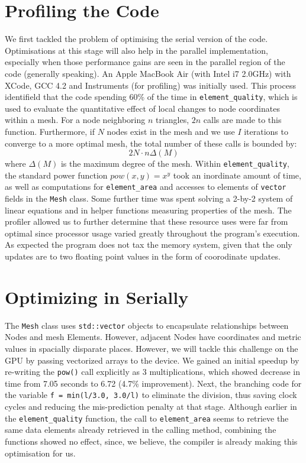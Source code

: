 \documentclass[a4paper,11pt, twocolumn]{article}
\begin{document}
\section{Profiling the Code}
We first tackled the problem of optimising the serial version of the code.  Optimisations at this stage will also help in the parallel implementation, especially when those performance gains are seen in the parallel region of the code (generally speaking).  An Apple MacBook Air (with Intel i7 2.0GHz) with XCode, GCC 4.2 and Instruments (for profiling) was initially used.  This process identifield that the code spending 60\% of the time in \verb+element_quality+, which is used to evaluate the quantitative effect of local changes to node coordinates within a mesh.  For a node neighboring $n$ triangles, $2n$ calls are made to this function.  Furthermore, if $N$ nodes exist in the mesh and we use $I$ iterations to converge to a more optimal mesh, the total number of these calls is bounded by:
$$
2N\cdot n\Delta(M)
$$
where $\Delta(M)$ is the maximum degree of the mesh.  Within \verb+element_quality+, the standard power function $pow(x, y) = x^y$ took an inordinate amount of time, as well as computations for \verb+element_area+ and accesses to elements of \verb+vector+ fields in the \verb+Mesh+ class.  Some further time was spent solving a 2-by-2 system of linear equations and in helper functions measuring properties of the mesh.  The profiler allowed us to further determine that these resource uses were far from optimal since processor usage varied greatly throughout the program's execution.  As expected the program does not tax the memory system, given that the only updates are to two floating point values in the form of coorodinate updates.

\section{Optimizing in Serially}
The \verb+Mesh+ class uses \verb+std::vector+ objects to encapsulate relationships between Nodes and mesh Elements.  However, adjacent Nodes have coordinates and metric values in spacially disparate places.  However, we will tackle this challenge on the GPU by passing vectorized arrays to the device.  
We gained an initial speedup by re-writing the \verb+pow()+ call explicitly as 3 multiplications, which showed decrease in time from 7.05 seconds to 6.72 (4.7\% improvement).  Next, the branching code for the variable \verb+f = min(l/3.0, 3.0/l)+ to eliminate the division, thus saving clock cycles and reducing the mis-prediction penalty at that stage.  Although earlier in the \verb+element_quality+ function, the call to \verb+element_area+ seems to retrieve the same data elements already retrieved in the calling method, combining the functions showed no effect, since, we believe, the compiler is already making this optimisation for us.  
\end{document}
